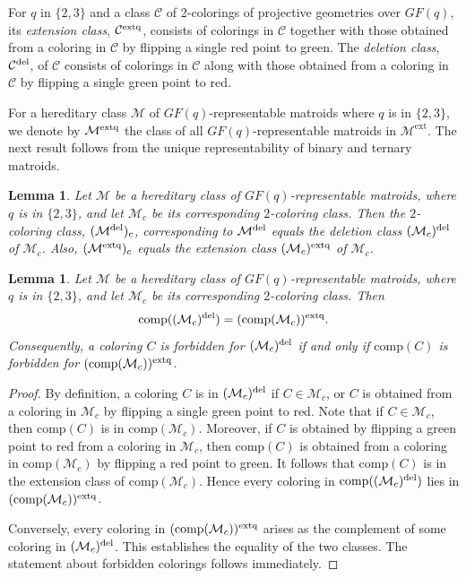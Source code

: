 \documentclass[11pt]{amsart}
\newtheorem{lemma}[theorem]{Lemma}
\theoremstyle{definition}
\theoremstyle{remark}
\numberwithin{equation}{section}
\newcommand\Me{\mathcal{M}^\mathrm{ext}}
\begin{document}
For $q$ in $\{2, 3\}$ and a class $\mathcal{C}$ of 2-colorings of projective geometries over $GF(q)$, its \textit{extension class}, $\mathcal{C}^{\rm extq}$, consists of colorings in $\mathcal{C}$ together with those obtained from a coloring in $\mathcal{C}$ by flipping a single red point to green. The \textit{deletion class}, $\mathcal{C}^{\rm del}$, of $\mathcal{C}$ consists of colorings in $\mathcal{C}$ along with those obtained from a coloring in $\mathcal{C}$ by flipping a single green point to red. 


For a hereditary class $\mathcal{M}$ of $GF(q)$-representable matroids where $q$ is in $\{2, 3\}$, we denote by $\mathcal{M}^{\rm extq}$ the class of all $GF(q)$-representable matroids in $\Me$. The next result follows from the unique representability of binary and ternary matroids.


\begin{lemma}
\label{commutative}
Let $\mathcal{M}$ be a hereditary class of $GF(q)$-representable matroids, where $q$ is in $\{2, 3\}$, and let $\mathcal{M}_c$ be its corresponding $2$-coloring class. Then the $2$-coloring class, $(\mathcal{M}^{\rm del})_c$, corresponding to $\mathcal{M}^{\rm del}$ equals the deletion class $(\mathcal{M}_c)^{\rm del}$ of $\mathcal{M}_c$. Also, $(\mathcal{M}^{\rm extq})_c$ equals the extension class $(\mathcal{M}_c)^{\rm extq}$ of $\mathcal{M}_c$.
\end{lemma}


\begin{lemma}
\label{deletion_extension_complementation}
Let $\mathcal{M}$ be a hereditary class of $GF(q)$-representable matroids, where $q$ is in $\{2, 3\}$, and let $\mathcal{M}_c$ be its corresponding $2$-coloring class. Then
\[
\mathrm{comp}((\mathcal{M}_c)^{\rm del}) = (\mathrm{comp}(\mathcal{M}_c))^{\rm extq}.
\]
Consequently, a coloring $C$ is forbidden for $(\mathcal{M}_c)^{\rm del}$ if and only if $\mathrm{comp}(C)$ is forbidden for $(\mathrm{comp}(\mathcal{M}_c))^{\rm extq}$.
\end{lemma}

\begin{proof}
By definition, a coloring $C$ is in $(\mathcal{M}_c)^{\rm del}$ if $C \in \mathcal{M}_c$, or $C$ is obtained from a coloring in $\mathcal{M}_c$ by flipping a single green point to red. Note that if $C \in \mathcal{M}_c$, then $\mathrm{comp}(C)$ is in  $\mathrm{comp}(\mathcal{M}_c)$. Moreover, if $C$ is obtained by flipping a green point to red from a coloring in $\mathcal{M}_c$, then $\mathrm{comp}(C)$ is obtained from a coloring in $\mathrm{comp}(\mathcal{M}_c)$ by flipping a red point to green. It follows that $\mathrm{comp}(C)$ is in the extension class of $\mathrm{comp}(\mathcal{M}_c)$. Hence every coloring in $\mathrm{comp}((\mathcal{M}_c)^{\rm del})$  lies in $(\mathrm{comp}(\mathcal{M}_c))^{\rm extq}$.

Conversely, every coloring in $(\mathrm{comp}(\mathcal{M}_c))^{\rm extq}$ arises as the complement of some coloring in $(\mathcal{M}_c)^{\rm del}$. This establishes the equality of the two classes. The statement about forbidden colorings follows immediately.
\end{proof}
\end{document}
